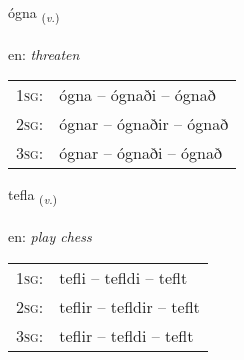 \documentclass[frontgrid, backgrid]{flacards}\usepackage[]{graphicx}\usepackage[]{xcolor}
\begin{document}
\renewcommand{\flhead}{\vskip5pt \fboxsep=0pt {\small\bfseries\footnotesize Sagnorð | Verb}}
\renewcommand{\fcfoot}{\vskip5pt \fboxsep=0pt \hspace{2pt}{\small\bfseries\footnotesize 3K}}

\renewcommand{\blhead}{\vskip5pt {\small\bfseries\footnotesize Sagnorð | Verb }}
\renewcommand{\bcfoot}{\vskip5pt \hspace{2pt}{\small\bfseries\footnotesize 3K}}


{ógna \small{\textsubscript{(\textit{v.})}} \\[1ex] %
\textphonetic{[oukna]} \\
en: \emph{threaten} \\  [2ex]
\renewcommand*{\arraystretch}{0.8}
\begin{tabular}{p{1cm}l}
\textsc{1sg}: & ógna -- ógnaði -- ógnað \\ 
\textsc{2sg}: & ógnar -- ógnaðir -- ógnað \\ 
\textsc{3sg}: & ógnar -- ógnaði -- ógnað \\ 
\end{tabular}
}

\renewcommand{\flhead}{\vskip5pt \fboxsep=0pt {\small\bfseries\footnotesize Sagnorð | Verb}}
\renewcommand{\fcfoot}{\vskip5pt \fboxsep=0pt \hspace{2pt}{\small\bfseries\footnotesize 3K}}

\renewcommand{\blhead}{\vskip5pt {\small\bfseries\footnotesize Sagnorð | Verb }}
\renewcommand{\bcfoot}{\vskip5pt \hspace{2pt}{\small\bfseries\footnotesize 3K}}


{tefla \small{\textsubscript{(\textit{v.})}} \\[1ex] %
\textphonetic{[tʰɛpla]} \\
en: \emph{play chess} \\  [2ex]
\renewcommand*{\arraystretch}{0.8}
\begin{tabular}{p{1cm}l}
\textsc{1sg}: & tefli -- tefldi -- teflt \\ 
\textsc{2sg}: & teflir -- tefldir -- teflt \\ 
\textsc{3sg}: & teflir -- tefldi -- teflt \\ 
\end{tabular}
}
\end{document}
